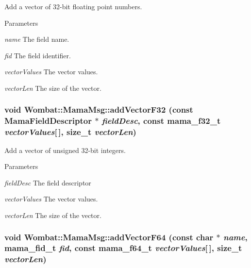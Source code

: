 Add a vector of 32-\/bit floating point numbers. 
\begin{DoxyParams}{Parameters}
\item[{\em name}]The field name. \item[{\em fid}]The field identifier. \item[{\em vectorValues}]The vector values. \item[{\em vectorLen}]The size of the vector. \end{DoxyParams}
\hypertarget{classWombat_1_1MamaMsg_a1d0d0283c79b617c3d02cf20bc13c493}{
\subsubsection[{addVectorF32}]{\setlength{\rightskip}{0pt plus 5cm}void Wombat::MamaMsg::addVectorF32 (const {\bf MamaFieldDescriptor} $\ast$ {\em fieldDesc}, \/  const mama\_\-f32\_\-t {\em vectorValues}\mbox{[}$\,$\mbox{]}, \/  size\_\-t {\em vectorLen})}}
\label{classWombat_1_1MamaMsg_a1d0d0283c79b617c3d02cf20bc13c493}


Add a vector of unsigned 32-\/bit integers. 
\begin{DoxyParams}{Parameters}
\item[{\em fieldDesc}]The field descriptor \item[{\em vectorValues}]The vector values. \item[{\em vectorLen}]The size of the vector. \end{DoxyParams}
\hypertarget{classWombat_1_1MamaMsg_a1c0a929a1f453a4d196157a48ede943d}{
\subsubsection[{addVectorF64}]{\setlength{\rightskip}{0pt plus 5cm}void Wombat::MamaMsg::addVectorF64 (const char $\ast$ {\em name}, \/  mama\_\-fid\_\-t {\em fid}, \/  const mama\_\-f64\_\-t {\em vectorValues}\mbox{[}$\,$\mbox{]}, \/  size\_\-t {\em vectorLen})}}
\label{classWombat_1_1MamaMsg_a1c0a929a1f453a4d196157a48ede943d}



